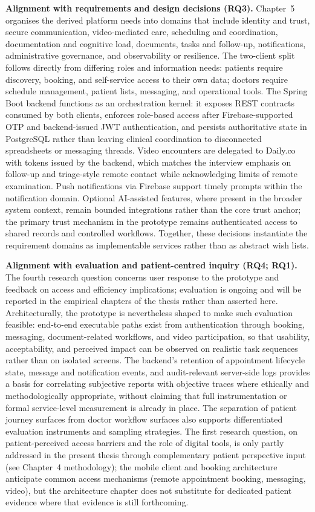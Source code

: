 \documentclass[11pt,a4paper,twoside,openany,headings=normal]{scrreprt}
\begin{document}
\textbf{Alignment with requirements and design decisions (RQ3).} Chapter~5 organises the derived platform needs into domains that include identity and trust, secure communication, video-mediated care, scheduling and coordination, documentation and cognitive load, documents, tasks and follow-up, notifications, administrative governance, and observability or resilience. The two-client split follows directly from differing roles and information needs: patients require discovery, booking, and self-service access to their own data; doctors require schedule management, patient lists, messaging, and operational tools. The Spring Boot backend functions as an orchestration kernel: it exposes REST contracts consumed by both clients, enforces role-based access after Firebase-supported OTP and backend-issued JWT authentication, and persists authoritative state in PostgreSQL rather than leaving clinical coordination to disconnected spreadsheets or messaging threads. Video encounters are delegated to Daily.co with tokens issued by the backend, which matches the interview emphasis on follow-up and triage-style remote contact while acknowledging limits of remote examination. Push notifications via Firebase support timely prompts within the notification domain. Optional AI-assisted features, where present in the broader system context, remain bounded integrations rather than the core trust anchor; the primary trust mechanism in the prototype remains authenticated access to shared records and controlled workflows. Together, these decisions instantiate the requirement domains as implementable services rather than as abstract wish lists.

\textbf{Alignment with evaluation and patient-centred inquiry (RQ4; RQ1).} The fourth research question concerns user response to the prototype and feedback on access and efficiency implications; evaluation is ongoing and will be reported in the empirical chapters of the thesis rather than asserted here. Architecturally, the prototype is nevertheless shaped to make such evaluation feasible: end-to-end executable paths exist from authentication through booking, messaging, document-related workflows, and video participation, so that usability, acceptability, and perceived impact can be observed on realistic task sequences rather than on isolated screens. The backend's retention of appointment lifecycle state, message and notification events, and audit-relevant server-side logs provides a basis for correlating subjective reports with objective traces where ethically and methodologically appropriate, without claiming that full instrumentation or formal service-level measurement is already in place. The separation of patient journey surfaces from doctor workflow surfaces also supports differentiated evaluation instruments and sampling strategies. The first research question, on patient-perceived access barriers and the role of digital tools, is only partly addressed in the present thesis through complementary patient perspective input (see Chapter~4 methodology); the mobile client and booking architecture anticipate common access mechanisms (remote appointment booking, messaging, video), but the architecture chapter does not substitute for dedicated patient evidence where that evidence is still forthcoming.
\end{document}
